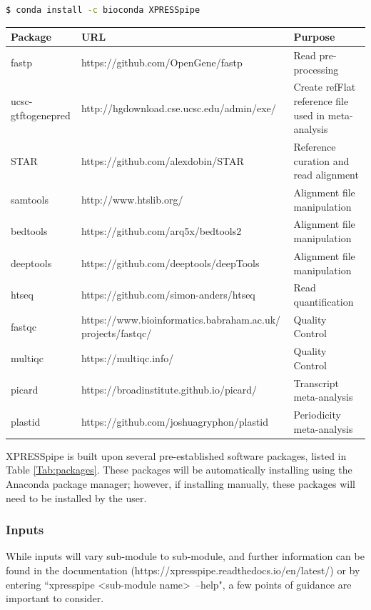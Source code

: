 \documentclass[11pt, a4paper, oneside]{article}
\begin{document}
\begin{lstlisting}[language=bash, caption=curateReference example]
$ conda install -c bioconda XPRESSpipe
\end{lstlisting}

\begin{tabular}{p{2.4cm}p{7.5cm}p{6.5cm}}
 \textbf{Package} & \textbf{URL} & \textbf{Purpose} \\
 \hline
 fastp & https://github.com/OpenGene/fastp & Read pre-processing \\
 \hline
 ucsc-gtftogenepred & http://hgdownload.cse.ucsc.edu/admin/exe/ & Create refFlat reference file used in meta-analysis \\
 \hline
 STAR & https://github.com/alexdobin/STAR & Reference curation and read alignment \\
 \hline
 samtools & http://www.htslib.org/ & Alignment file manipulation \\
 \hline
 bedtools & https://github.com/arq5x/bedtools2 & Alignment file manipulation \\
 \hline
 deeptools & https://github.com/deeptools/deepTools & Alignment file manipulation \\
 \hline
 htseq & https://github.com/simon-anders/htseq & Read quantification \\
 \hline
 fastqc & https://www.bioinformatics.babraham.ac.uk/ projects/fastqc/ & Quality Control \\
 \hline
 multiqc & https://multiqc.info/ & Quality Control \\
 \hline
 picard & https://broadinstitute.github.io/picard/ & Transcript meta-analysis \\
 \hline
 plastid & https://github.com/joshuagryphon/plastid & Periodicity meta-analysis \\
\end{tabular}
\newline

XPRESSpipe is built upon several pre-established software packages, listed in Table \ref{Tab:packages}. These packages will be automatically installing using the Anaconda package manager; however, if installing manually, these packages will need to be installed by the user.

\subsubsection{Inputs}
While inputs will vary sub-module to sub-module, and further information can be found in the documentation (https://xpresspipe.readthedocs.io/en/latest/) or by entering ``xpresspipe \textless sub-module name\textgreater \ --help", a few points of guidance are important to consider.
\end{document}
